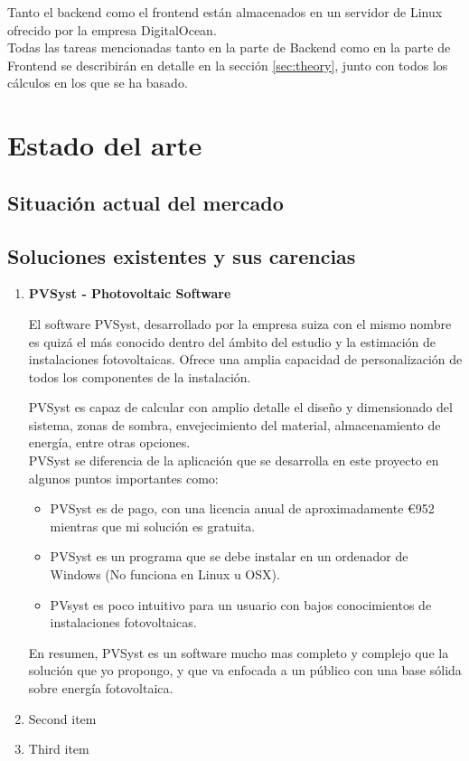 \documentclass[11pt]{report}
\begin{document}
Tanto el backend como el frontend están almacenados en un servidor de Linux ofrecido por la empresa DigitalOcean.\\

Todas las tareas mencionadas tanto en la parte de Backend como en la parte de Frontend se describirán en detalle en la sección \ref{sec:theory}, junto con todos los cálculos en los que se ha basado. 

\newpage

\chapter{Estado del arte}

\section{Situación actual del mercado}

\section{Soluciones existentes y sus carencias} \label{existing_solutions}
\begin{enumerate}
\item \textbf{PVSyst - Photovoltaic Software}

El software PVSyst, desarrollado por la empresa suiza con el mismo nombre es quizá el más conocido dentro del ámbito del estudio y la estimación de instalaciones fotovoltaicas. Ofrece una amplia capacidad de personalización de todos los componentes de la instalación.

PVSyst es capaz de calcular con amplio detalle el diseño y dimensionado del sistema, zonas de sombra, envejecimiento del material, almacenamiento de energía, entre otras opciones.\\

PVSyst se diferencia de la aplicación que se desarrolla en este proyecto en algunos puntos importantes como:
	\begin{itemize}
		\item PVSyst es de pago, con una licencia anual de aproximadamente \euro{952} mientras que mi solución es gratuita.
		\item PVSyst es un programa que se debe instalar en un ordenador de Windows (No funciona en Linux u OSX).
		\item PVsyst es poco intuitivo para un usuario con bajos conocimientos de instalaciones fotovoltaicas.
	\end{itemize}
En resumen, PVSyst es un software mucho mas completo y complejo que la solución que yo propongo, y que va enfocada a un público con una base sólida sobre energía fotovoltaica.
\item Second item
\item Third item
\end{enumerate}
\end{document}
